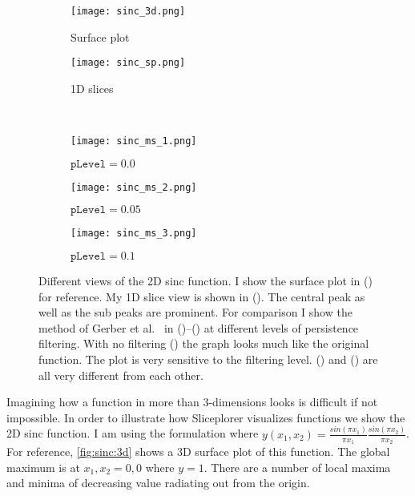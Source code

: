\begin{figure}
  \centering
  \begin{subfigure}[b]{0.3\linewidth}
    \texttt{[image: sinc\_3d.png]}
    \caption{
      Surface plot
    }
    \label{fig:sinc:3d}
  \end{subfigure}
  \qquad\qquad%
  \begin{subfigure}[b]{0.3\linewidth}
    \texttt{[image: sinc\_sp.png]}
    \caption{
      1D slices
    }
    \label{fig:sinc:sp}
  \end{subfigure}
  \\
  \begin{subfigure}[b]{0.3\linewidth}
    \texttt{[image: sinc\_ms\_1.png]}
    \caption{
      $\texttt{pLevel} = 0.0$
    }
    \label{fig:sinc:ms_1}
  \end{subfigure}
  \hfill
  \begin{subfigure}[b]{0.3\linewidth}
    \texttt{[image: sinc\_ms\_2.png]}
    \caption{
      $\texttt{pLevel} = 0.05$
    }
    \label{fig:sinc:ms_2}
  \end{subfigure}
  \hfill
  \begin{subfigure}[b]{0.3\linewidth}
    \texttt{[image: sinc\_ms\_3.png]}
    \caption{
      $\texttt{pLevel} = 0.1$
    }
    \label{fig:sinc:ms_3}
  \end{subfigure}
  \caption[Different views of the 2D sinc function.]{%
    Different views of the 2D sinc function. I show the surface plot
    in () for reference. My 1D slice view is shown
    in (). The central peak as well as the sub peaks
    are prominent. For comparison I show the method of Gerber et 
    al.~\cite{Gerber:2010} in 
    ()--() at different levels 
    of persistence filtering. 
    With no filtering () the graph looks much like the
    original function. The plot is very sensitive to the filtering level.
    () and () are all very 
    different from each other.
  }
  \label{fig:sinc}
\end{figure}

Imagining how a function in more than 3-dimensions looks is difficult if not
impossible. In order to illustrate how Sliceplorer visualizes functions we show
the 2D sinc function. 
I am using the formulation where 
$y(x_1,x_2) = \frac{sin(\pi x_1)}{\pi x_1} \frac{sin(\pi x_2)}{\pi x_2}$.
For reference, \autoref{fig:sinc:3d} shows a 3D surface plot of this function. The 
global maximum is at $x_1,x_2 = 0,0$ where $y=1$. There are a number of local
maxima and minima of decreasing value radiating out from the origin.

